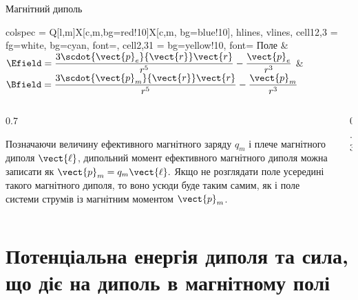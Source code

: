\documentclass{beamer}
\begin{document}
\begin{frame}{Магнітний диполь}{}
\begin{onlyenv}
\begin{center}
\begin{tblr}{
				colspec      = {Q[l,m]X[c,m,bg=red!10]X[c,m, bg=blue!10]},
				hlines,
				vlines,
				cell{1}{2,3} = {fg=white, bg=cyan, font=\bfseries},
				cell{2,3}{1} = {bg=yellow!10, font=\bfseries}
			}
				Поле
					& $\Efield = \dfrac{3\scdot{\vect{p}_e}{\vect{r}}\vect{r}}{r^5} - \dfrac{\vect{p}_e}{r^3} $
					& $\Bfield = \dfrac{3\scdot{\vect{p}_m}{\vect{r}}\vect{r}}{r^5} - \dfrac{\vect{p}_m}{r^3}$ \\
			\end{tblr}
		\end{center}
		\begin{columns}
			\begin{column}{0.7\linewidth}
				\begin{block}{}\justifying\small
					Позначаючи величину ефективного магнітного заряду $q_m$ і плече
					магнітного диполя $\vect{\ell}$, дипольний момент ефективного
					магнітного диполя можна записати як \( \vect{p}_m = q_m \vect{\ell}.
					\) Якщо не розглядати поле усередині такого магнітного диполя, то воно
					усюди буде таким самим, як і поле системи струмів із магнітним
					моментом $\vect{p}_m$.
				\end{block}
			\end{column}
			\begin{column}{0.3\linewidth}\centering
			\end{column}
		\end{columns}
	\end{onlyenv}
\end{frame}

\section{Потенціальна енергія диполя та сила, що діє на диполь в магнітному полі}
\end{document}
